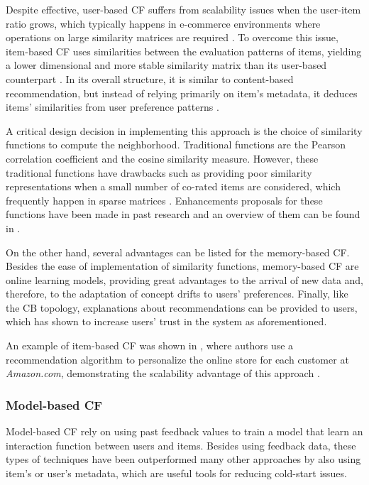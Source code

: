     Despite effective, user-based CF suffers from scalability issues when the user-item ratio grows, which typically happens in e-commerce environments where operations on large similarity matrices are required \cite{10.1016/j.ins.2007.07.024, 10.5555/2842045.2842365, 10.1016/j.knosys.2015.03.001}. To overcome this issue, item-based CF uses similarities between the evaluation patterns of items, yielding a lower dimensional and more stable similarity matrix than its user-based counterpart \cite{2003amazon, 10.1155/2009/421425}. In its overall structure, it is similar to content-based recommendation, but instead of relying primarily on item's metadata, it deduces items' similarities from user preference patterns \cite{2001sarwar}.

    A critical design decision in implementing this approach is the choice of similarity functions to compute the neighborhood. Traditional functions are the Pearson correlation coefficient and the cosine similarity measure. However, these traditional functions have drawbacks such as providing poor similarity representations when a small number of co-rated items are considered, which frequently happen in sparse matrices \cite{2016Textbook}. Enhancements proposals for these functions have been made in past research and an overview of them can be found in \cite{10.1145/3133264.3133299}.

    On the other hand, several advantages can be listed for the memory-based CF. Besides the ease of implementation of similarity functions, memory-based CF are online learning models, providing great advantages to the arrival of new data and, therefore, to the adaptation of concept drifts to users' preferences. Finally, like the CB topology, explanations about recommendations can be provided to users, which has shown to increase users' trust in the system as aforementioned.

    An example of item-based CF was shown in \cite{2003amazon}, where authors use a recommendation algorithm to personalize the online store for each customer at \textit{Amazon.com}, demonstrating the scalability advantage of this approach \cite{2003amazon}.

  \subsubsection{Model-based CF}

  Model-based CF rely on using past feedback values to train a model that learn an interaction function between users and items. Besides using feedback data, these types of techniques have been outperformed many other approaches by also using item's or user's metadata, which are useful tools for reducing cold-start issues.

